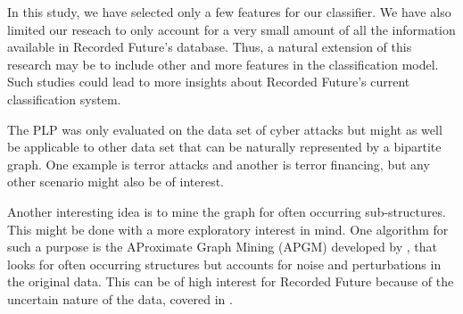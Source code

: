 In this study, we have selected only a few features for our classifier. We have also limited our reseach to only account for a very small amount of all the information available in Recorded Future's database. Thus, a natural extension of this research may be to include other and more features in the classification model. Such studies could lead to more insights about Recorded Future's current classification system.

The PLP was only evaluated on the data set of cyber attacks but might as well be applicable to other data set that can be naturally represented by a bipartite graph. One example is terror attacks and another is terror financing, but any other scenario might also be of interest.

Another interesting idea is to mine the graph for often occurring sub-structures. This might be done with a more exploratory interest in mind. One algorithm for such a purpose is the AProximate Graph Mining (APGM) developed by \citet{Jia2011}, that looks for often occurring structures but accounts for noise and perturbations in the original data. This can be of high interest for Recorded Future because of the uncertain nature of the data, covered in .
